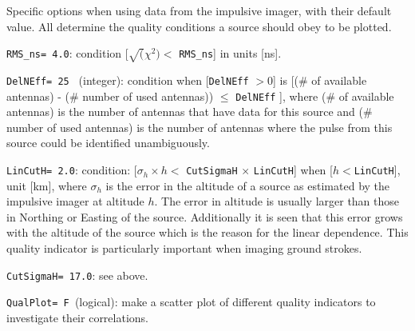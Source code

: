 Specific options when using data from the impulsive imager, with their default value. All determine the quality conditions a source should obey to be plotted.
\begin{enumerate*}
\item \verb!RMS_ns= 4.0!: condition [$\sqrt(\chi^2) <$ \verb!RMS_ns!] in units [ns].
\item \verb!DelNEff= 25 ! (integer): condition when [\verb!DelNEff! $>0$] is [(\# of available antennas) - (\# number of used antennas)) $\leq$ \verb!DelNEff! ], where (\# of available antennas) is the number of antennas that have data for this source and (\# number of used antennas) is the number of antennas where the pulse from this source could be identified unambiguously.
\item \verb!LinCutH= 2.0!: condition: [$\sigma_h \times h <$ \verb!CutSigmaH! $\times$ \verb!LinCutH!] when [$h < $\verb!LinCutH!], unit [km], where $\sigma_h$ is the error in the altitude of a source as estimated by the impulsive imager at altitude $h$. The error in altitude is usually larger than those in Northing or Easting of the source. Additionally it is seen that this error grows with the altitude of the source which is the reason for the linear dependence. This quality indicator is particularly important when imaging ground strokes.
\item \verb!CutSigmaH= 17.0!: see above.
\item \verb!QualPlot= F !(logical): make a scatter plot of different quality indicators to investigate their correlations.
\end{enumerate*}

